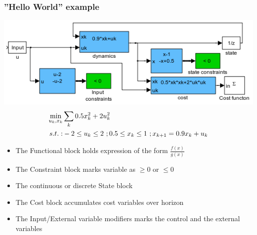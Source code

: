 \documentclass[mathserif]{beamer}
\begin{document}
\begin{frame}
\frametitle{''Hello World'' example}

\centering 
\includegraphics[width = .7\textwidth]{HelloWorld}
\begin {align}
\min_{u_k,x_k}& \sum_k 0.5x_k^2 + 2u_k^2 \notag \\
s.t.:&  -2 \leq u_k \leq 2 \ ; 0.5 \leq x_k \leq 1\ ; x_{k+1}=0.9x_k+u_k \notag
\end{align}


\begin{itemize}
\item The \alert{Functional} block holds expression of the form $\frac{f(x)}{g(x)}$   
\item The \alert{Constraint} block marks variable as $\geq 0$ or $\leq 0$
\item The continuous or discrete \alert{State} block
\item The \alert{Cost} block accumulates cost variables over horizon
\item The \alert{Input/External} variable modifiers marks the control and the
  external variables
\end{itemize}
\end{frame}
\end{document}
